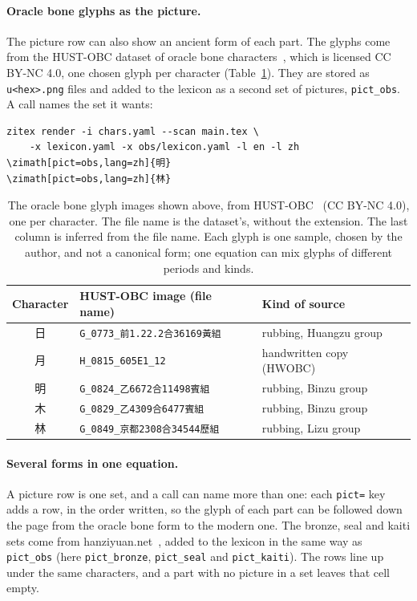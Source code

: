 \documentclass[11pt]{article}
\begin{document}
\paragraph{Oracle bone glyphs as the picture.}
The picture row can also show an ancient form of each part. The glyphs come from the HUST-OBC dataset of oracle bone characters~\cite{hustobc},
which is licensed CC BY-NC 4.0, one chosen glyph per character (Table~\ref{tab:glyphs}). They are stored as \texttt{u<hex>.png} files and added to
the lexicon as a second set of pictures, \texttt{pict\_obs}. A call names the set it wants:

\begin{verbatim}
zitex render -i chars.yaml --scan main.tex \
    -x lexicon.yaml -x obs/lexicon.yaml -l en -l zh
\zimath[pict=obs,lang=zh]{明}
\zimath[pict=obs,lang=zh]{林}
\end{verbatim}


\begin{table}[ht]
\centering\small
{}%
\begin{tabular}{@{}cll@{}}
\toprule
Character & HUST-OBC image (file name) & Kind of source \\
\midrule
日 & \texttt{G\_0773\_前1.22.2合36169黃組} & rubbing, Huangzu group \\
月 & \texttt{H\_0815\_605E1\_12} & handwritten copy (HWOBC) \\
明 & \texttt{G\_0824\_乙6672合11498賓組} & rubbing, Binzu group \\
木 & \texttt{G\_0829\_乙4309合6477賓組} & rubbing, Binzu group \\
林 & \texttt{G\_0849\_京都2308合34544歷組} & rubbing, Lizu group \\
\bottomrule
\end{tabular}
\caption{The oracle bone glyph images shown above, from HUST-OBC~\cite{hustobc} (CC BY-NC 4.0), one per character. The file name is the
dataset's, without the extension. The last column is inferred from the file name. Each glyph is one sample, chosen by the author,
and not a canonical form; one equation can mix glyphs of different periods and kinds.}
\label{tab:glyphs}
\end{table}

\paragraph{Several forms in one equation.}
A picture row is one set, and a call can name more than one: each \texttt{pict=} key adds a row, in the order written, so the glyph of
each part can be followed down the page from the oracle bone form to the modern one. The bronze, seal and kaiti sets come from
hanziyuan.net~\cite{hanziyuan}, added to the lexicon in the same way as \texttt{pict\_obs} (here \texttt{pict\_bronze}, \texttt{pict\_seal}
and \texttt{pict\_kaiti}). The rows line up under the same characters, and a part with no picture in a set leaves that cell empty.
\end{document}

